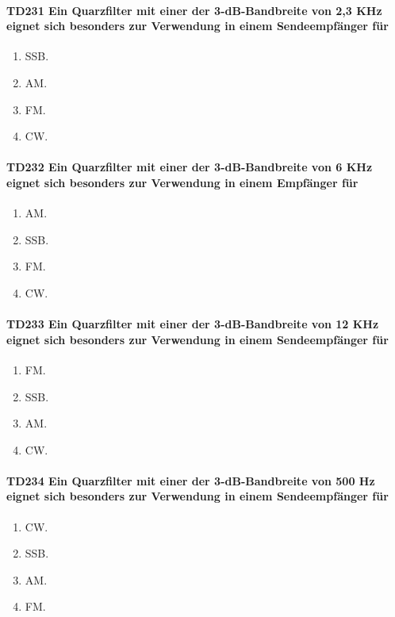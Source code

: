 \documentclass[8pt]{article}
\begin{document}
\begin{enumerate}
\begin{enumerate}[nolistsep,label=\Alph*]
{\paragraph*{TD231 Ein Quarzfilter mit einer der 3-dB-Bandbreite von 2,3 KHz eignet sich besonders zur Verwendung in einem Sendeempfänger für} 
\begin{enumerate}[nolistsep,label=\Alph*]
\item SSB.
\item AM.
\item FM.
\item CW.
\end{enumerate}

\paragraph*{TD232 Ein Quarzfilter mit einer der 3-dB-Bandbreite von 6 KHz eignet sich besonders zur Verwendung in einem Empfänger für}
\begin{enumerate}[nolistsep,label=\Alph*]
\item AM.
\item SSB.
\item FM.
\item CW.
\end{enumerate}

\paragraph*{TD233 Ein Quarzfilter mit einer der 3-dB-Bandbreite von 12 KHz eignet sich besonders zur Verwendung in einem Sendeempfänger für} 
\begin{enumerate}[nolistsep,label=\Alph*]
\item FM.
\item SSB.
\item AM.
\item CW.
\end{enumerate}

\paragraph*{TD234 Ein Quarzfilter mit einer der 3-dB-Bandbreite von 500 Hz eignet sich besonders zur Verwendung in einem Sendeempfänger für} 
\begin{enumerate}[nolistsep,label=\Alph*]
\item CW.
\item SSB.
\item AM.
\item FM.
\end{enumerate}

}
\end{enumerate}
\end{enumerate}
\end{document}
